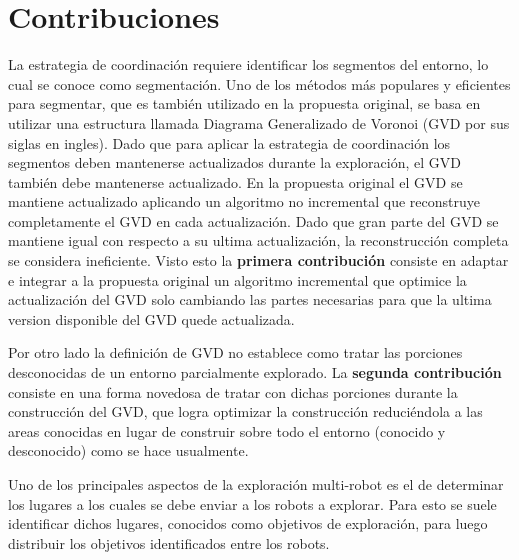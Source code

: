 \section{Contribuciones}

La estrategia de coordinación requiere identificar los segmentos del entorno,
lo cual se conoce como segmentación. Uno de los métodos más populares y
eficientes para segmentar, que es también utilizado en la propuesta original, se
basa en utilizar una estructura llamada Diagrama Generalizado de Voronoi (GVD
por sus siglas en ingles). Dado que para aplicar la estrategia de coordinación
los segmentos deben mantenerse actualizados durante la exploración, el GVD
también debe mantenerse actualizado. En la propuesta original el GVD se
mantiene actualizado aplicando un algoritmo no incremental que
reconstruye completamente el GVD en cada actualización. Dado que gran parte del GVD se
mantiene igual con respecto a su ultima actualización, la reconstrucción
completa se considera ineficiente. Visto esto la \textbf{primera contribución}
consiste en adaptar e integrar a la propuesta original un algoritmo incremental
que optimice la actualización del GVD solo cambiando las partes necesarias para
que la ultima version disponible del GVD quede actualizada. 


Por otro lado la definición de GVD no establece como tratar las porciones
desconocidas de un entorno parcialmente explorado. La \textbf{segunda contribución}
consiste en una forma novedosa de tratar con dichas porciones durante la
construcción del GVD, que logra optimizar la construcción reduciéndola a las areas
conocidas en lugar de construir sobre todo el entorno (conocido y desconocido)
como se hace usualmente.

Uno de los principales aspectos de la exploración multi-robot es el de
determinar los lugares a los cuales se debe enviar a los robots a explorar.
Para esto se suele identificar dichos lugares, conocidos como objetivos de
exploración, para luego distribuir los objetivos identificados entre los robots.


